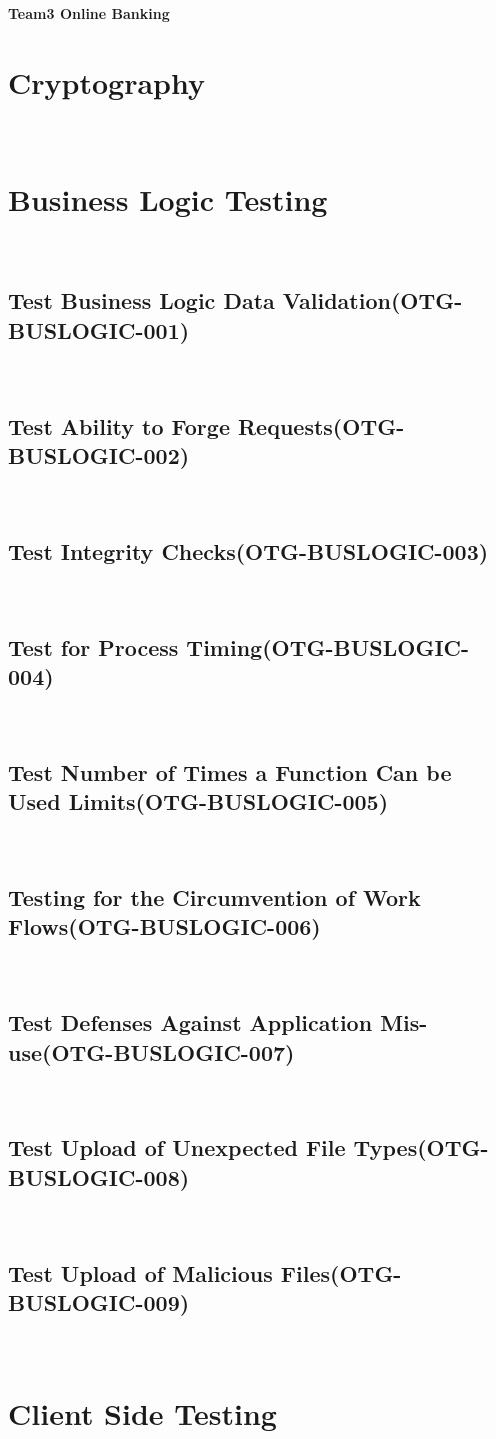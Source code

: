 \documentclass[headsepline,footsepline,footinclude=false,oneside,fontsize=11pt,paper=a4,listof=totoc,bibliography=totoc]{scrbook} %
\begin{document}
\textbf{Team3 Online Banking}


\section{Cryptography}\

\pagebreak
\section{Business Logic Testing}\
\subsection{Test Business Logic Data Validation(OTG-BUSLOGIC-001)}\
\pagebreak
\subsection{Test Ability to Forge Requests(OTG-BUSLOGIC-002)}\
\pagebreak
\subsection{Test Integrity Checks(OTG-BUSLOGIC-003)}\
\pagebreak
\subsection{Test for Process Timing(OTG-BUSLOGIC-004)}\
\pagebreak
\subsection{Test Number of Times a Function Can be Used Limits(OTG-BUSLOGIC-005)}\
\pagebreak
\subsection{Testing for the Circumvention of Work Flows(OTG-BUSLOGIC-006)}\
\pagebreak
\subsection{Test Defenses Against Application Mis-use(OTG-BUSLOGIC-007)}\
\pagebreak
\subsection{Test Upload of Unexpected File Types(OTG-BUSLOGIC-008)}\
\pagebreak
\subsection{Test Upload of Malicious Files(OTG-BUSLOGIC-009)}\


\section{Client Side Testing}




\appendix{}

\glsaddall{} %
\printglossaries{}

\printbibliography{}
\end{document}
